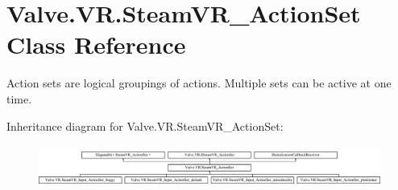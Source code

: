 \hypertarget{class_valve_1_1_v_r_1_1_steam_v_r___action_set}{}\section{Valve.\+V\+R.\+Steam\+V\+R\+\_\+\+Action\+Set Class Reference}
\label{class_valve_1_1_v_r_1_1_steam_v_r___action_set}


Action sets are logical groupings of actions. Multiple sets can be active at one time.  


Inheritance diagram for Valve.\+V\+R.\+Steam\+V\+R\+\_\+\+Action\+Set\+:\begin{figure}[H]
\begin{center}
\leavevmode
\includegraphics[height=1.409396cm]{class_valve_1_1_v_r_1_1_steam_v_r___action_set}
\end{center}
\end{figure}
